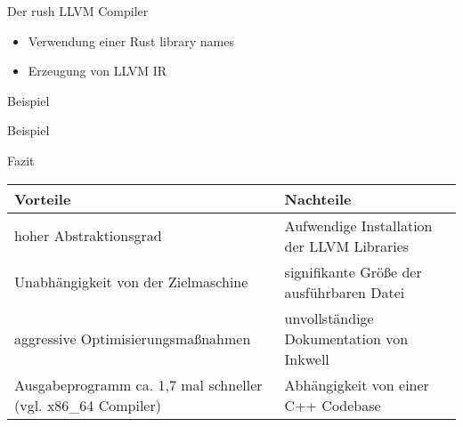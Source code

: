 \begin{frame}{Der rush LLVM Compiler}
	\begin{itemize}
		\item Verwendung einer Rust library names 
		\item Erzeugung von LLVM IR
	\end{itemize}
\end{frame}

\begin{frame}{Beispiel}
	\begin{center}
		\begin{minipage}{.6\textwidth}
		\end{minipage}
	\end{center}
\end{frame}

\begin{frame}{Beispiel}
\end{frame}

\begin{frame}{Fazit}
	\begin{table}[h]
		\begin{tabularx}{0.95\textwidth}{L|L}
			 Vorteile                                 &  Nachteile               \\
			\hline
			hoher Abstraktionsgrad                                        & Aufwendige Installation der LLVM Libraries \\
			Unabhängigkeit von der Zielmaschine                           & signifikante Größe der ausführbaren Datei  \\
			aggressive Optimisierungsmaßnahmen                            & unvollständige Dokumentation von Inkwell   \\
			Ausgabeprogramm ca. 1,7 mal schneller (vgl. x86\_64 Compiler) & Abhängigkeit von einer C++ Codebase        \\
		\end{tabularx}
	\end{table}
\end{frame}
